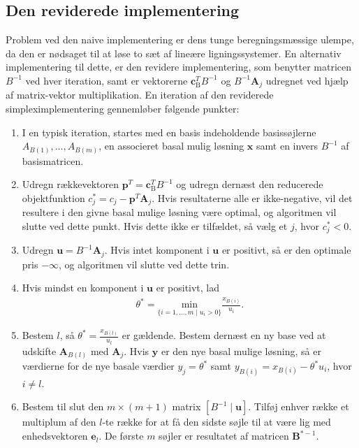 \subsection{Den reviderede implementering}
Problem ved den naive implementering er dens tunge beregningsmæssige ulempe, da den er nødsaget til at løse to sæt af lineære ligningssystemer. En alternativ implementering til dette, er den revidere implementering, som benytter matricen $B^{-1}$ ved hver iteration, samt er  vektorerne $\mathbf{c}_{\text{B}}^T B^{-1}$ og $B^{-1} \mathbf{A}_j$ udregnet ved hjælp af matrix-vektor multiplikation. En iteration af den reviderede simpleximplementering gennemløber følgende punkter: 
% 
\begin{col}{}{}
\begin{enumerate}
\item I en typisk iteration, startes med en basis indeholdende basissøjlerne $A_{B(1)},\ldots,A_{B(m)}$, en associeret basal mulig løsning $\mathbf{x}$ samt en invers $B^{-1}$ af basismatricen. 
\item Udregn rækkevektoren $\mathbf{p}^T=\mathbf{c}_{\text{B}}^T B^{-1}$ og udregn dernæst den reducerede objektfunktion $c_j^* = c_j - \mathbf{p}^T \mathbf{A}_j$. Hvis resultaterne alle er ikke-negative, vil det resultere i den givne basal mulige løsning være optimal, og algoritmen vil slutte ved dette punkt. Hvis dette ikke er tilfældet, så vælg et $j$, hvor $c_j^* < 0$.
\item Udregn $\mathbf{u}=B^{-1}\mathbf{A}_j$. Hvis intet komponent i $\mathbf{u}$ er positivt, så er den optimale pris $-\infty$, og algoritmen vil slutte ved dette trin. 
%
%
\item Hvis mindst en komponent i $\mathbf{u}$ er positivt, lad 
\begin{align*}
\theta^*=\underset{\{i=1,\ldots,m \mid u_i>0\}}{\text{min}}\frac{x_{B(i)}}{u_i}.
\end{align*}
\item Bestem $l$, så $\theta^*=\frac{x_{B(l)}}{u_l}$ er gældende. Bestem dernæst en ny base ved at udskifte $\mathbf{A}_{B(l)}$ med $\mathbf{A}_j$. Hvis $\mathbf{y}$ er den nye basal mulige løsning, så er værdierne for de nye basale værdier $y_j=\theta^*$ samt $y_{B(i)}=x_{B(i)}-\theta^*u_i$, hvor $i \neq l$.
\item Bestem til slut den $m \times (m+1)$ matrix $\left [B^{-1} \mid \mathbf{u} \right ]$. Tilføj enhver række et multiplum af den $l$-te række for at få den sidste søjle til at være lig med enhedsvektoren $\mathbf{e}_l$. De første $m$ søjler er resultatet af matricen $\mathbf{B}^{*-1}$.
\end{enumerate}
\end{col}
\noindent
%
%
